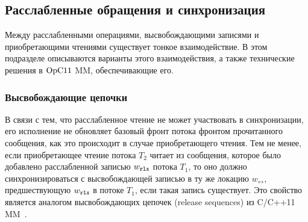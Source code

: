 \subsection{Расслабленные обращения и синхронизация}
Между расслабленными операциями, высвобождающими записями и
приобретающими чтениями существует тонкое взаимодействие.
В этом подразделе описываются варианты этого взаимодействия, а также
технические решения в $\mathrm{OpC11}$ MM, обеспечивающие его.

\subsubsection{Высвобождающие цепочки}
\label{sec:opc11:releaseseq}
В связи с тем, что расслабленное чтение не может участвовать в синхронизации,
его исполнение не обновляет базовый фронт потока фронтом прочитанного сообщения,
как это происходит в случае приобретающего чтения.
Тем не менее, если приобретающее чтение потока $T_2$ читает из сообщения, которое
было добавлено расслабленной записью $w_{\mathtt{rlx}}$ потока $T_1$, то оно должно синхронизироваться
с высвобождающей записью в ту же локацию $w_{\rel}$, предшествующую $w_{\mathtt{rlx}}$ в потоке $T_1$,
если такая запись существует.
Это свойство является аналогом высвобождающих цепочек (release sequences) из
C/C++11 MM~\cite{Batty-al:POPL11}.

